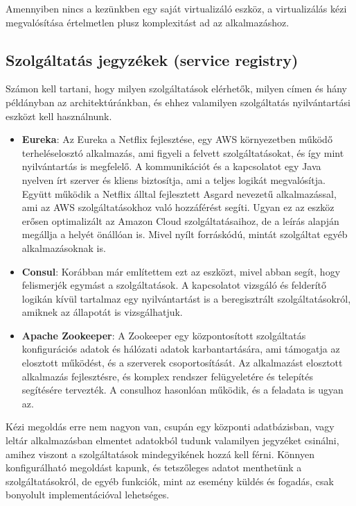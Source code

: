 \documentclass[11pt,magyar,a4paper,twoside,]{report}
\begin{document}
Amennyiben nincs a kezünkben egy saját virtualizáló eszköz, a
virtualizálás kézi megvalósítása értelmetlen plusz komplexitást ad az
alkalmazáshoz.

\subsection{Szolgáltatás jegyzékek (service
registry)}\label{szolguxe1ltatuxe1s-jegyzuxe9kek-service-registry}

Számon kell tartani, hogy milyen szolgáltatások elérhetők, milyen címen
és hány példányban az architektúránkban, és ehhez valamilyen
szolgáltatás nyilvántartási eszközt\citep{service-registry-pattern}
\citep{micro-introPt3} kell használnunk.

\begin{itemize}
\item
  \textbf{Eureka}\citep{eureka-glance}: Az Eureka a Netflix fejlesztése,
  egy AWS környezetben működő terheléselosztó alkalmazás, ami figyeli a
  felvett szolgáltatásokat, és így mint nyilvántartás is megfelelő. A
  kommunikációt és a kapcsolatot egy Java nyelven írt szerver és kliens
  biztosítja, ami a teljes logikát megvalósítja. Együtt működik a
  Netflix álltal fejlesztett Asgard nevezetű alkalmazással, ami az AWS
  szolgáltatásokhoz való hozzáférést segíti. Ugyan ez az eszköz erősen
  optimalizált az Amazon Cloud szolgáltatásaihoz, de a leírás alapján
  megállja a helyét önállóan is. Mivel nyílt forráskódú, mintát
  szolgáltat egyéb alkalmazásoknak is.
\item
  \textbf{Consul}: Korábban már említettem ezt az eszközt, mivel abban
  segít, hogy felismerjék egymást a szolgáltatások. A kapcsolatot
  vizsgáló és felderítő logikán kívül tartalmaz egy nyilvántartást is a
  beregisztrált szolgáltatásokról, amiknek az állapotát is
  vizsgálhatjuk.
\item
  \textbf{Apache Zookeeper}\citep{zookeeper}: A Zookeeper egy
  központosított szolgáltatás konfigurációs adatok és hálózati adatok
  karbantartására, ami támogatja az elosztott működést, és a szerverek
  csoportosítását. Az alkalmazást elosztott alkalmazás fejlesztésre, és
  komplex rendszer felügyeletére és telepítés segítésére tervezték. A
  consulhoz hasonlóan működik, és a feladata is ugyan az.
\end{itemize}

Kézi megoldás erre nem nagyon van, csupán egy központi adatbázisban,
vagy leltár alkalmazásban elmentet adatokból tudunk valamilyen jegyzéket
csinálni, amihez viszont a szolgáltatások mindegyikének hozzá kell
férni. Könnyen konfigurálható megoldást kapunk, és tetszőleges adatot
menthetünk a szolgáltatásokról, de egyéb funkciók, mint az esemény
küldés és fogadás, csak bonyolult implementációval lehetséges.
\end{document}
